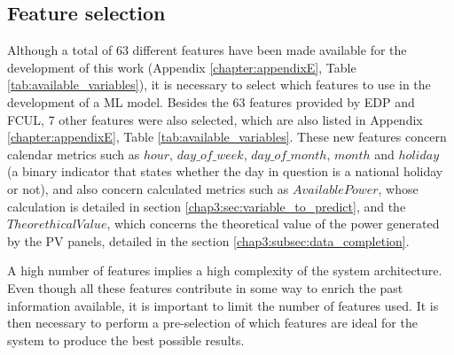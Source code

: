 
\subsection{Feature selection}\label{chap3:subsec:feature_selection}

Although a total of 63 different features have been made available for the development of this work (Appendix \ref{chapter:appendixE}, Table \ref{tab:available_variables}), it is necessary to select which features to use in the development of a \ac{ML} model. Besides the 63 features provided by \ac{EDP} and \ac{FCUL}, 7 other features were also selected, which are also listed in Appendix \ref{chapter:appendixE}, Table \ref{tab:available_variables}. These new features concern calendar metrics such as $hour$, $day\_of\_week$, $day\_of\_month$, $month$ and $holiday$ (a binary indicator that states whether the day in question is a national holiday or not), and also concern calculated metrics such as $AvailablePower$, whose calculation is detailed in section \ref{chap3:sec:variable_to_predict}, and the $TheorethicalValue$, which concerns the theoretical value of the power generated by the \ac{PV} panels, detailed in the section \ref{chap3:subsec:data_completion}. 

A high number of features implies a high complexity of the system architecture. Even though all these features contribute in some way to enrich the past information available, it is important to limit the number of features used. It is then necessary to perform a pre-selection of which features are ideal for the system to produce the best possible results. 

